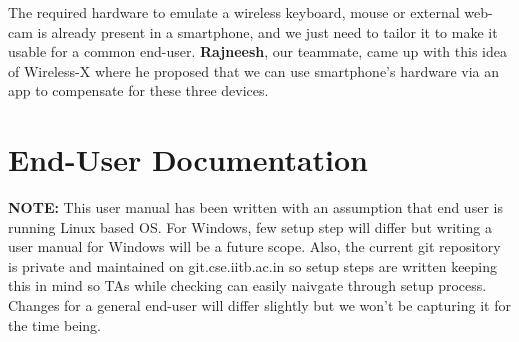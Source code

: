 \documentclass[12pt, letterpaper]{article}
\begin{document}
The required hardware to emulate a wireless keyboard, mouse or external web-cam is already present in a smartphone, and we just need to tailor it to make it usable for a common end-user. \textbf{Rajneesh}, our teammate, came up with this idea of Wireless-X where he proposed that we can use smartphone's hardware via an app to compensate for these three devices.

\section{End-User Documentation}
\textbf{NOTE:} This user manual has been written with an assumption that end user is running Linux based OS. For Windows, few setup step will differ but writing a user manual for Windows will be a future scope. Also, the current git repository is private and maintained on git.cse.iitb.ac.in so setup steps are written keeping this in mind so TAs while checking can easily naivgate through setup process. Changes for a general end-user will differ slightly but we won't be capturing it for the time being.
\end{document}
